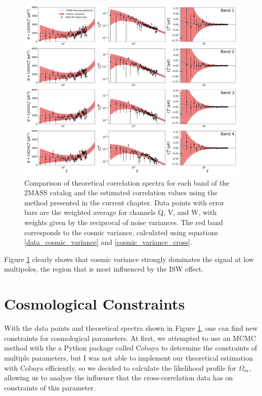 \documentclass[openany,a4paper,12pt,oneside]{book}
\begin{document}
\begin{spacing}{1.5}
\begin{figure}[!htb]
	\centering
	\includegraphics[width=\linewidth]{Imagens/Full_Data_Plot.png}
	\caption{Comparison of theoretical correlation spectra for each band of the 2MASS catalog and the estimated correlation values using the method presented in the current chapter. Data points with error bars are the weighted average for channels Q, V, and W, with weights given by the reciprocal of noise variances. The red band corresponds to the cosmic variance, calculated using equations \eqref{data_cosmic_variance} and \eqref{cosmic_variance_cross}.}
	\label{fig:correlation_data_final_plots}
\end{figure}

Figure \ref{fig:correlation_data_final_plots} clearly shows that cosmic variance strongly dominates the signal at low multipoles, the region that is most influenced by the ISW effect.

\chapter{Cosmological Constraints}\label{chapter:constraints}

With the data points and theoretical spectra shown in Figure \ref{fig:correlation_data_final_plots}, one can find new constraints for cosmological parameters. At first, we attempted to use an MCMC method with the a Python package called Cobaya\cite{CobayaASCL, Cobaya_preprint} to determine the constraints of multiple parameters, but I was not able to implement our theoretical estimation with Cobaya efficiently, so we decided to calculate the likelihood profile for $\Omega_m$, allowing us to analyse the influence that the cross-correlation data has on constraints of this parameter.


\end{spacing}
\end{document}

